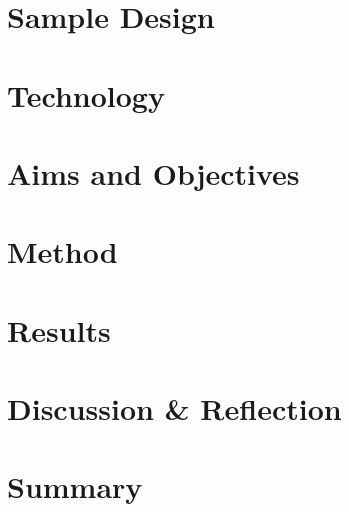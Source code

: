 \label{sec:personal:introduction}



\section{Sample Design}
\label{sec:personal:sampledesign}



\section{Technology}
\label{sec:personal:technology}



\section{Aims and Objectives}
\label{sec:personal:aims}



\section{Method}
\label{sec:personal:method}



\section{Results}
\label{sec:personal:results}



\section{Discussion \& Reflection}
\label{sec:personal:discussion}



\section{Summary}
\label{sec:personal:summary}

